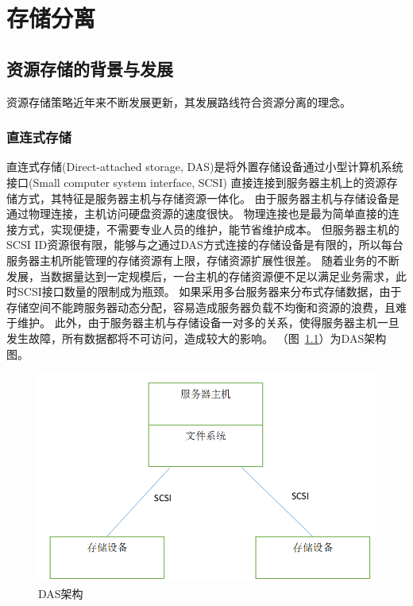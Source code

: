 
\chapter{存储分离} %

\label{Chapter3} %

\section{资源存储的背景与发展}
资源存储策略近年来不断发展更新，其发展路线符合资源分离的理念。
\subsection{直连式存储}

直连式存储(Direct-attached storage, DAS)是将外置存储设备通过小型计算机系统接口(Small computer system interface, SCSI)
直接连接到服务器主机上的资源存储方式，其特征是服务器主机与存储资源一体化。
由于服务器主机与存储设备是通过物理连接，主机访问硬盘资源的速度很快。
物理连接也是最为简单直接的连接方式，实现便捷，不需要专业人员的维护，能节省维护成本。
但服务器主机的SCSI ID资源很有限，能够与之通过DAS方式连接的存储设备是有限的，所以每台服务器主机所能管理的存储资源有上限，存储资源扩展性很差。
随着业务的不断发展，当数据量达到一定规模后，一台主机的存储资源便不足以满足业务需求，此时SCSI接口数量的限制成为瓶颈。
如果采用多台服务器来分布式存储数据，由于存储空间不能跨服务器动态分配，容易造成服务器负载不均衡和资源的浪费，且难于维护。
此外，由于服务器主机与存储设备一对多的关系，使得服务器主机一旦发生故障，所有数据都将不可访问，造成较大的影响。
（图~\ref{fig:das_architecture}）为DAS架构图。

\begin{figure}
\centering
\includegraphics[scale=0.45]{Figures/storage/das_architecture.jpg}
\decoRule
\caption{DAS架构}
\label{fig:das_architecture}
\end{figure}

